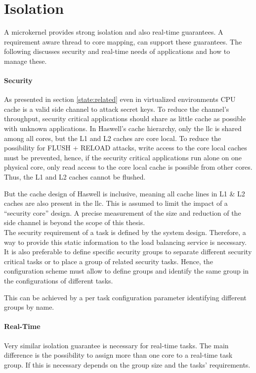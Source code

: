 \section{Isolation}
\label{design:isolation}

A microkernel provides strong isolation and also real-time guarantees.
A requirement aware thread to core mapping, can support these guarantees.
The following discusses security and real-time needs of applications and how to
manage these.

\paragraph{Security}
As presented in section \ref{state:related} even in virtualized environments
CPU cache is a valid side channel to attack secret keys.
To reduce the channel's throughput, security critical applications should share
as little cache as possible with unknown applications.
In Haswell's cache hierarchy, only the \gls{llc} is shared among all cores, but
the L1 and L2 caches are core local.
To reduce the possibility for FLUSH + RELOAD attacks, write access to the core
local caches must be prevented, hence, if the security critical applications
run alone on one physical core, only read access to the core local cache is
possible from other cores.
Thus, the L1 and L2 caches cannot be flushed.

But the cache design of Haswell is inclusive, meaning all cache lines in L1 \&
L2 caches are also present in the \gls{llc}.
This is assumed to limit the impact of a ``security core'' design.
A precise measurement of the size and reduction of the side channel is beyond
the scope of this thesis.
\\

The security requirement of a task is defined by the system design.
Therefore, a way to provide this static information to the load balancing
service is necessary.
It is also preferable to define specific security groups to separate different
security critical tasks or to place a group of related security tasks.
Hence, the configuration scheme must allow to define groups and identify the
same group in the configurations of different tasks.

This can be achieved by a per task configuration parameter identifying
different groups by name.


\paragraph{Real-Time}
Very similar isolation guarantee is necessary for real-time tasks.
The main difference is the possibility to assign more than one core to a
real-time task group.
If this is necessary depends on the group size and the tasks' requirements.

